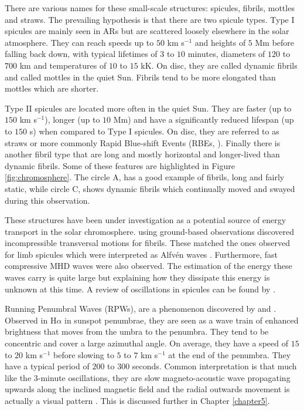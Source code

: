     There are various names for these small-scale structures: spicules, fibrils, mottles and straws.
    The prevailing hypothesis is that there are two spicule types.
    Type I spicules are mainly seen in ARs but are scattered loosely elsewhere in the solar atmosphere.
    They can reach speeds up to $50$ km s$^{-1}$ and heights of $5$ Mm before falling back down, with typical lifetimes of $3$ to $10$ minutes, diameters of $120$ to $700$ km and temperatures of $10$ to $15$ kK.
    On disc, they are called dynamic fibrils and called mottles in the quiet Sun.
    Fibrils tend to be more elongated than mottles which are shorter.
    
    Type II spicules are located more often in the quiet Sun.
    They are faster (up to $150$ km s$^{-1}$), longer (up to $10$ Mm) and have a significantly reduced lifespan (up to $150$ s) when compared to Type I spicules.
    On disc, they are referred to as straws or more commonly Rapid Blue-shift Events (RBEs, \citealt{Zaqarashvili2009}).
    Finally there is another fibril type that are long and mostly horizontal and longer-lived than dynamic fibrils.
    Some of these features are highlighted in Figure \ref{fig:chromosphere}.
    The circle A, has a good example of fibrils, long and fairly static, while circle C, shows dynamic fibrils which continually moved and swayed during this observation.
    
    These structures have been under investigation as a potential source of energy transport in the solar chromosphere.
    \cite{Morton2012} using ground-based observations discovered incompressible transversal motions for fibrils.
    These matched the ones observed for limb spicules which were interpreted as Alfv\'en waves \citep{DePontieu2007}.
    Furthermore, fast compressive MHD waves were also observed.
    The estimation of the energy these waves carry is quite large but explaining how they dissipate this energy is unknown at this time.
    A review of oscillations in spicules can be found by \cite{Zaqarashvili2009}. 

    Running Penumbral Waves (RPWs), are a phenomenon discovered by \cite{Zirin1972} and \cite{Giovanelli1972}. 
    Observed in H$\alpha$ in sunspot penumbrae, they are seen as a wave train of enhanced brightness that moves from the umbra to the penumbra.
    They tend to be concentric and cover a large azimuthal angle.
    On average, they have a speed of $15$ to $20$ km s$^{-1}$ before slowing to $5$ to $7$ km s$^{-1}$ at the end of the penumbra.
    They have a typical period of $200$ to $300$ seconds. 
    Common interpretation is that much like the $3$-minute oscillations, they are slow magneto-acoustic wave propagating upwards along the inclined magnetic field and the radial outwards movement is actually a visual pattern \citep{UTMO,ORWS,OASO}.
    This is discussed further in Chapter \ref{chapter5}.
    
